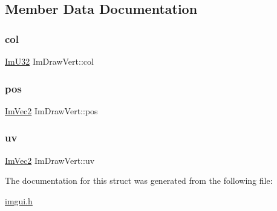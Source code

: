 \subsection{Member Data Documentation}
\mbox{\label{struct_im_draw_vert_ab98ba53ce2690b56f5ba94682ed83940}} 
\subsubsection{\texorpdfstring{col}{col}}
{\footnotesize\ttfamily \mbox{\hyperlink{imgui_8h_a118cff4eeb8d00e7d07ce3d6460eed36}{Im\+U32}} Im\+Draw\+Vert\+::col}

\mbox{\label{struct_im_draw_vert_aedc578bbf364ddea71be12b4f177a5b4}} 
\subsubsection{\texorpdfstring{pos}{pos}}
{\footnotesize\ttfamily \mbox{\hyperlink{struct_im_vec2}{Im\+Vec2}} Im\+Draw\+Vert\+::pos}

\mbox{\label{struct_im_draw_vert_abdf3183529055a6c3f709b23a4bf06b1}} 
\subsubsection{\texorpdfstring{uv}{uv}}
{\footnotesize\ttfamily \mbox{\hyperlink{struct_im_vec2}{Im\+Vec2}} Im\+Draw\+Vert\+::uv}



The documentation for this struct was generated from the following file\+:\begin{DoxyCompactItemize}
\item 
\mbox{\hyperlink{imgui_8h}{imgui.\+h}}\end{DoxyCompactItemize}
